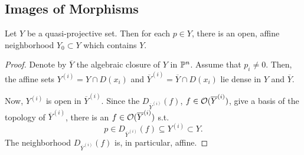 \subsection{Images of Morphisms}
\begin{lemma}
	Let $Y$ be a quasi-projective set. Then for each $p \in Y$, there is an open, affine neighborhood $Y_0 \subset Y$ which contains $Y$.
\end{lemma}
\begin{proof}
	Denote by $\overline{Y}$ the algebraic closure of $Y$ in $\P^n$. Assume that $p_i \neq 0$.
	Then, the affine sets $Y^{(i)} = Y \cap D(x_i)$ and $\overline{Y}^{(i)} = \overline{Y} \cap D(x_i)$ lie dense in $Y$ and $\overline{Y}$.
	
	Now, $Y^{(i)}$ is open in $\overline{Y}^{(i)}$. Since the $D_{\overline{Y}^{(i)}}(f)$, $f \in \O(\overline{Y}^{(i)})$, give a basis of the topology of $\overline{Y}^{(i)}$, there is an $f \in \O(\overline{Y}^{(i)})$ s.t.
	\[ p \in D_{\overline{Y}^{(i)}}(f) \subseteq {Y}^{(i)} \subset Y. \]
	The neighborhood $ D_{\overline{Y}^{(i)}}(f)$ is, in particular, affine.
\end{proof}


